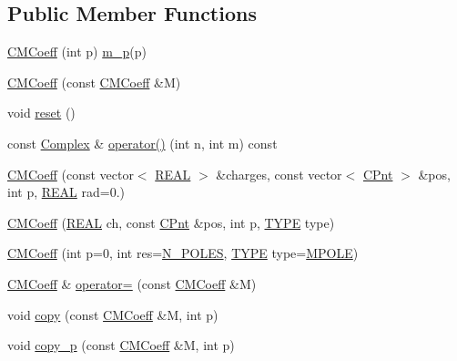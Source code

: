 \subsection*{Public Member Functions}
\begin{DoxyCompactItemize}
\item 
\hyperlink{classCMCoeff_adba776bf8062ab89f60588c138fd562e}{C\-M\-Coeff} (int p) \hyperlink{classCMCoeff_adf49f0bd55b7c496b887f547695aba38}{m\-\_\-p}(p)
\item 
\hyperlink{classCMCoeff_ae5a7fcbb8f989dbbff71d79738fd9356}{C\-M\-Coeff} (const \hyperlink{classCMCoeff}{C\-M\-Coeff} \&M)
\item 
void \hyperlink{classCMCoeff_a2cca0942d27c02cf846810bf465f7ebb}{reset} ()
\item 
const \hyperlink{util_8h_a0ef19d29521fc1e3356ea268ba175cfc}{Complex} \& \hyperlink{classCMCoeff_ae408956538bebea8ad276df0026b2af2}{operator()} (int n, int m) const 
\item 
\hyperlink{classCMCoeff_aee6ebc4dd1ad9096babcaba957db66c7}{C\-M\-Coeff} (const vector$<$ \hyperlink{util_8h_a5821460e95a0800cf9f24c38915cbbde}{R\-E\-A\-L} $>$ \&charges, const vector$<$ \hyperlink{classCPnt}{C\-Pnt} $>$ \&pos, int p, \hyperlink{util_8h_a5821460e95a0800cf9f24c38915cbbde}{R\-E\-A\-L} rad=0.)
\item 
\hyperlink{classCMCoeff_a44f54126d3f90484420f1baf14ed491f}{C\-M\-Coeff} (\hyperlink{util_8h_a5821460e95a0800cf9f24c38915cbbde}{R\-E\-A\-L} ch, const \hyperlink{classCPnt}{C\-Pnt} \&pos, int p, \hyperlink{classCMCoeff_a0b490eeb5ba86bc1a95ea1c3b2946478}{T\-Y\-P\-E} type)
\item 
\hyperlink{classCMCoeff_a52820257419417dd2d18a75e276fd011}{C\-M\-Coeff} (int p=0, int res=\hyperlink{mcoeff_8h_ac23f9c13c5d07d9ce386f7a830c35e5a}{N\-\_\-\-P\-O\-L\-E\-S}, \hyperlink{classCMCoeff_a0b490eeb5ba86bc1a95ea1c3b2946478}{T\-Y\-P\-E} type=\hyperlink{classCMCoeff_a0b490eeb5ba86bc1a95ea1c3b2946478a44c2e68e32e879f210aab9493a0fb48d}{M\-P\-O\-L\-E})
\item 
\hyperlink{classCMCoeff}{C\-M\-Coeff} \& \hyperlink{classCMCoeff_a92c5e5e988695c301c47e3212930a68f}{operator=} (const \hyperlink{classCMCoeff}{C\-M\-Coeff} \&M)
\item 
void \hyperlink{classCMCoeff_a7010837883b56f9b972888bffb6fbb3d}{copy} (const \hyperlink{classCMCoeff}{C\-M\-Coeff} \&M, int p)
\item 
void \hyperlink{classCMCoeff_aba7b82a12360b0789af87a8dda74863b}{copy\-\_\-p} (const \hyperlink{classCMCoeff}{C\-M\-Coeff} \&M, int p)

\end{DoxyCompactItemize}
